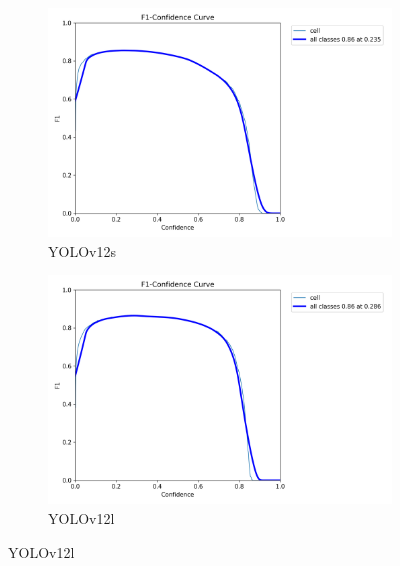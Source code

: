 \documentclass[12pt,a4paper,onecolumn,oneside]{report}
\begin{document}
\begin{figure}[H]
  \vspace{0.5cm}
  \begin{subfigure}[b]{0.48\textwidth}
    \centering
    \includegraphics[width=\textwidth]{figuras/resultados experimentacion/yolov12s/test/BoxF1_curve.png}
    \caption{YOLOv12s}
    \label{fig:yolov12s_test}
  \end{subfigure}
  \hfill
  \begin{subfigure}[b]{0.48\textwidth}
    \centering
    \includegraphics[width=\textwidth]{figuras/resultados experimentacion/yolov12l/test/BoxF1_curve.png}
    \caption{YOLOv12l}
    \label{fig:yolov12l_test}
  \end{subfigure}
  

\end{figure}
\end{document}
